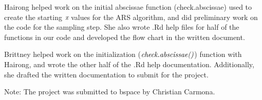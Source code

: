 \documentclass{article}\usepackage[]{graphicx}\usepackage[]{color}
\begin{document}
Hairong helped work on the initial abscissae function (check.abscissae) used to create the starting $\emph{x}$ values for the ARS algorithm, and did preliminary work on the code for the sampling step.  She also wrote .Rd help files for half of the functions in our code and developed the flow chart in the written document.

Brittney helped work on the initialization ($\emph{check.abscissae()}$) function with Hairong, and wrote the other half of the .Rd help documentation.  Additionally, she drafted the written documentation to submit for the project.


Note: The project was submitted to bspace by Christian Carmona.
\end{document}
